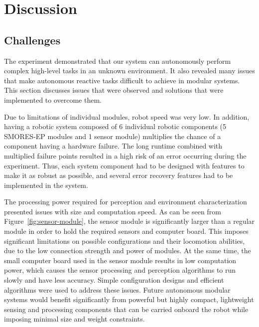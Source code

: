 \documentclass[conference]{IEEEtran}
\begin{document}
\section{Discussion}
\label{sec:discussion}
%
\subsection{Challenges}
The experiment demonstrated that our system can autonomously perform complex high-level tasks in an unknown environment. It also revealed many issues that make autonomous reactive tasks difficult to achieve in modular systems. This section discusses issues that were observed and solutions that were implemented to overcome them.

Due to limitations of individual modules, robot speed was very low. In addition, having a robotic system composed of 6 individual robotic components (5 SMORES-EP modules and 1 sensor module) multiplies the chance of a component having a hardware failure. The long runtime combined with multiplied failure points resulted in a high risk of an error occurring during the experiment. Thus, each system component had to be designed with features to make it as robust as possible, and several error recovery features had to be implemented in the system.

The processing power required for perception and environment characterization presented issues with size and computation speed. As can be seen from Figure~\ref{fig:sensor-module}, the sensor module is significantly larger than a regular module in order to hold the required sensors and computer board. This imposes significant limitations on possible configurations and their locomotion abilities, due to the low connection strength and power of modules. At the same time, the small computer board used in the sensor module results in low computation power, which causes the sensor processing and perception algorithms to run slowly and have less accuracy. Simple configuration designs and efficient algorithms were used to address these issues. Future autonomous modular systems would benefit significantly from powerful but highly compact, lightweight sensing and processing components that can be carried onboard the robot while imposing minimal size and weight constraints.
\end{document}
